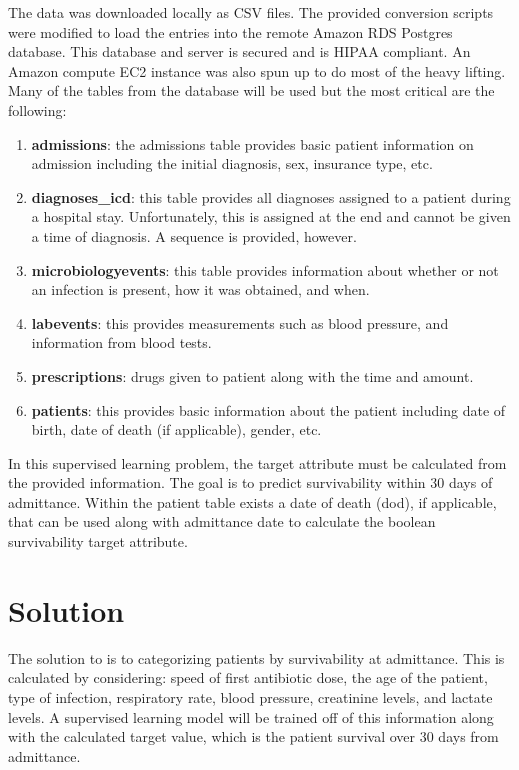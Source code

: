\documentclass[11pt]{article}
\begin{document}
The data was downloaded locally as CSV files. The provided conversion scripts were modified to load the entries into the remote Amazon RDS Postgres database. This database and server is secured and is HIPAA compliant. An Amazon compute EC2 instance was also spun up to do most of the heavy lifting. Many of the tables from the database will be used but the most critical are the following:
\begin{enumerate}
\item \textbf{admissions}: the admissions table provides basic patient information on admission including the initial diagnosis, sex, insurance type, etc.
\item \textbf{diagnoses\_icd}: this table provides all diagnoses assigned to a patient during a hospital stay. Unfortunately, this is assigned at the end and cannot be given a time of diagnosis. A sequence is provided, however.
\item \textbf{microbiologyevents}: this table provides information about whether or not an infection is present, how it was obtained, and when.
\item \textbf{labevents}: this provides measurements such as blood pressure, and information from blood tests.
\item \textbf{prescriptions}: drugs given to patient along with the time and amount.
\item \textbf{patients}: this provides basic information about the patient including date of birth, date of death (if applicable), gender, etc.
\end{enumerate}

In this supervised learning problem, the target attribute must be calculated from the provided information. The goal is to predict survivability within 30 days of admittance. Within the patient table exists a date of death (dod), if applicable, that can be used along with admittance date to calculate the boolean survivability target attribute.


\section{Solution}
The solution to is to categorizing patients by survivability at admittance. This is calculated by considering: speed of first antibiotic dose, the age of the patient, type of infection, respiratory rate, blood pressure, creatinine levels, and lactate levels. A supervised learning model will be trained off of this information along with the calculated target value, which is the patient survival over 30 days from admittance.
\end{document}

